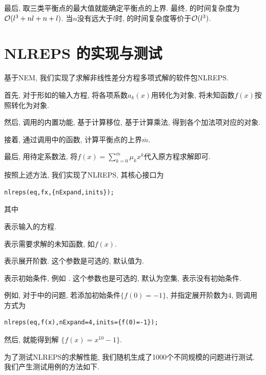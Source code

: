 最后, 取三类平衡点的最大值就能确定平衡点的上界. 最终, 的时间复杂度为$\mathcal O(l^3+nl+n+l)$. 当$n$没有远大于$l$时, 的时间复杂度等价于$\mathcal O(l^3)$.

\section{NLREPS 的实现与测试}\label{ch4sec4}

基于NEM, 我们实现了求解非线性差分方程多项式解的软件包NLREPS.
\begin{compactenum}[(1)]
\item 首先, 对于形如的输入方程, 将各项系数$a_k(x)$用转化为对象, 将未知函数$f(x)$按照转化为对象. 
\item 然后, 调用的内置功能, 基于计算移位, 基于计算乘法, 得到各个加法项对应的对象. 
\item 接着, 通过调用中的函数, 计算平衡点的上界$\overline{m}$.
\item 最后, 用待定系数法, 将$f(x)=\sum_{k=0}^{\overline{m}}{\mu_k x^k}$代入原方程求解即可. 
\end{compactenum}

按照上述方法, 我们实现了NLREPS, 其核心接口为
\begin{verbatim}
nlreps(eq,fx,{nExpand,inits});
\end{verbatim}
其中
\begin{compactitem}[\textbullet]
\item {} 表示输入的方程.
\item {} 表示需要求解的未知函数, 如$f(x)$.
\item {} 表示展开阶数. 这个参数是可选的, 默认值为. 
\item {} 表示初始条件, 例如 . 这个参数也是可选的, 默认为空集, 表示没有初始条件. 
\end{compactitem}

例如, 对于中的问题, 若添加初始条件$\{f(0)=-1\}$, 并指定展开阶数为4, 则调用方式为
\begin{verbatim}
nlreps(eq,f(x),nExpand=4,inits={f(0)=-1});
\end{verbatim}
然后, 就能得到解 $\{f(x)=x^{10}-1\}$.

为了测试NLREPS的求解性能, 我们随机生成了1000个不同规模的问题进行测试. 我们产生测试用例的方法如下.


